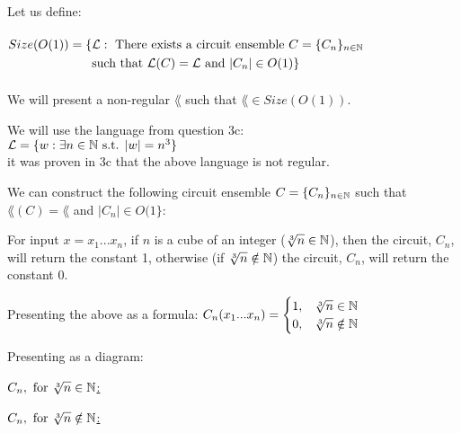 Let us define: \\ \\
$
    \begin{aligned}
        Size(O(1)) = \{ & \mathcal{L} : \text{ There exists a circuit ensemble } C=\{C_n\}_{n \in \mathbb{N}} \\
                        & \text{such that } \mathcal{L}(C)=\mathcal{L} \text{ and } |C_n|\in O(1)\}
    \end{aligned}
$ \\ \\
We will present a non-regular $\lang$ such that $\lang \in Size(O(1))$.

We will use the language from question 3c: \\
$\mathcal{L}=\{w : \exists n \in \mathbb{N} \text{ s.t. } |w| = n^3\}$ \\
it was proven in 3c that the above language is not regular.

We can construct the following circuit ensemble $C=\{C_n\}_{n \in \mathbb{N}}$ such that
$\lang(C)=\lang$ and $|C_n|\in O(1\}$:

For input $x=x_1...x_n$, if $n$ is a cube of an integer ($\sqrt[3]{n} \in \mathbb{N}$), then
the circuit, $C_n$, will return the constant 1, otherwise (if $\sqrt[3]{n} \notin \mathbb{N}$)
the circuit, $C_n$, will return the constant 0.

Presenting the above as a formula:
$
    C_n(x_1 ... x_n) =
    \begin{cases}
        1 , & \sqrt[3]{n} \in \mathbb{N}    \\
        0 , & \sqrt[3]{n} \notin \mathbb{N} \\
    \end{cases}
$

Presenting as a diagram:

\underline{$C_n, \text{ for } \sqrt[3]{n} \in \mathbb{N}$:}
\begin{center}
\end{center}

\underline{$C_n, \text{ for } \sqrt[3]{n} \notin \mathbb{N}$:}
\begin{center}
\end{center}

